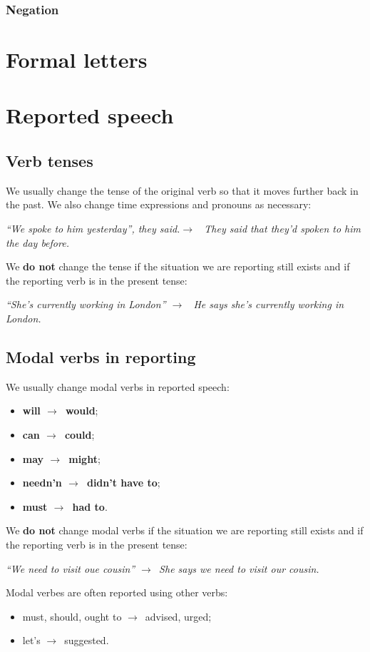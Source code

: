 \documentclass{article}
\newcommand{\tox}{$\longrightarrow$\ }
\begin{document}
\subsubsection{Negation}


\section{Formal letters}

\newpage
\section{Reported speech}
\subsection{Verb tenses}
We usually change the tense of the original verb so that it moves
further back in the past. We also change time expressions and pronouns
as necessary:

\textit{``We spoke to him yesterday'', they said.\tox
They said that they'd spoken to him the day before.}

We \textbf{do not} change the tense if the situation we are reporting still
exists and if the reporting verb is in the present tense:

\textit{``She's currently working in London'' \tox
He says she's currently working in London.}

\subsection{Modal verbs in reporting}
We usually change modal verbs in reported speech:
\begin{itemize}
    \item \textbf{will \tox would};
    \item \textbf{can \tox could};
    \item \textbf{may \tox might};
    \item \textbf{needn'n \tox didn't have to};
    \item \textbf{must \tox had to}.
\end{itemize}

We \textbf{do not} change modal verbs if the situation we are
reporting still exists and if the reporting verb is in the present
tense:

\textit{``We need to visit oue cousin'' \tox She says we need to
visit our cousin.}

Modal verbes are often reported using other verbs:
\begin{itemize}
    \item must, should, ought to \tox advised, urged;
    \item let's \tox suggested.
\end{itemize}
\end{document}
